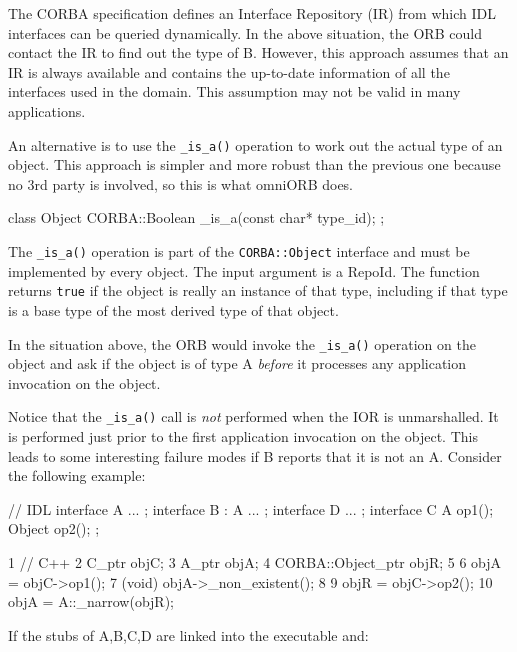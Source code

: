 \documentclass[11pt,twoside,a4paper]{book}
\newcommand{\intf}[1]{\texttt{#1}}
\newcommand{\code}[1]{\texttt{#1}}
\newcommand{\op}[1]{\texttt{#1()}}
\begin{document}
The CORBA specification defines an Interface Repository (IR) from
which IDL interfaces can be queried dynamically. In the above
situation, the ORB could contact the IR to find out the type of B.
However, this approach assumes that an IR is always available and
contains the up-to-date information of all the interfaces used in the
domain. This assumption may not be valid in many applications.

An alternative is to use the \op{\_is\_a} operation to work out the
actual type of an object. This approach is simpler and more robust
than the previous one because no 3rd party is involved, so this is
what omniORB does.

\begin{cxxlisting}
class Object{
    CORBA::Boolean _is_a(const char* type_id);
};
\end{cxxlisting}

The \op{\_is\_a} operation is part of the \intf{CORBA::Object}
interface and must be implemented by every object. The input argument
is a RepoId. The function returns \code{true} if the object is really
an instance of that type, including if that type is a base type of the
most derived type of that object.

In the situation above, the ORB would invoke the \op{\_is\_a}
operation on the object and ask if the object is of type A
\emph{before} it processes any application invocation on the object.

Notice that the \op{\_is\_a} call is \emph{not} performed when the IOR
is unmarshalled. It is performed just prior to the first application
invocation on the object. This leads to some interesting failure modes
if B reports that it is not an A. Consider the following example:

\begin{idllisting}
// IDL
interface A { ... };
interface B : A { ... };
interface D { ... };
interface C {
  A      op1();
  Object op2();
};
\end{idllisting}

\lstset{numbers=left,gobble=4}
\begin{cxxlisting}
 1  // C++
 2  C_ptr objC;
 3  A_ptr objA;
 4  CORBA::Object_ptr objR;
 5
 6  objA =  objC->op1();
 7  (void) objA->_non_existent();
 8
 9  objR =  objC->op2();
10  objA =  A::_narrow(objR);
\end{cxxlisting}
\lstset{numbers=none,gobble=0}

\noindent If the stubs of A,B,C,D are linked into the executable and:
\end{document}
